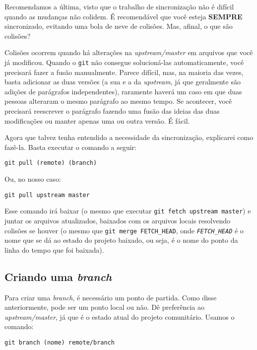 \documentclass[a4paper,oneside,10pt]{memoir}
\begin{document}
Recomendamos a última, visto que o trabalho de sincronização não é difícil
quando as mudanças não colidem. É recomendável que você esteja \textbf{SEMPRE}
sincronizado, evitando uma bola de neve de colisões. Mas, afinal, o que são
colisões?

Colisões ocorrem quando há alterações na \emph{upstream/master} em arquivos que
você já modificou. Quando o \texttt{git} não consegue solucioná-las
automaticamen\-te, você precisará fazer a fusão manualmente. Parece difícil,
mas, na maioria das vezes, basta adicionar as duas versões (a sua e a da
\emph{upstream}, já que geralmente são adições de parágrafos independentes),
raramente haverá um caso em que duas pessoas alteraram o mesmo parágrafo ao
mesmo tempo. Se acontecer, você precisará reescrever o parágrafo fazendo uma
fusão das ideias das duas modificações ou manter apenas uma ou outra versão. É
fácil.

Agora que talvez tenha entendido a necessidade da sincronização, explicarei
como fazê-la. Basta executar o comando a seguir:

\begin{center}
\texttt{git pull (remote) (branch)}
\end{center}

Ou, no nosso caso:

\begin{center}
\texttt{git pull upstream master}
\end{center}

Esse comando irá baixar (o mesmo que executar \texttt{git fetch upstream
mas\-ter}) e juntar os arquivos atualizados, baixados com os arquivos locais
resolvendo colisões se houver (o mesmo que \texttt{git merge FETCH\_HEAD}, onde
\emph{\texttt{FETCH\_\-HEAD}} é o nome que se dá ao estado do projeto baixado,
ou seja, é o nome do ponto da linha do tempo que foi baixada).

\subsection{Criando uma \emph{branch}}

Para criar uma \emph{branch}, é necessário um ponto de partida. Como disse
anteriormente, pode ser um ponto local ou não. Dê preferência ao
\emph{upstream/master}, já que é o estado atual do projeto comunitário. Usamos
o comando:

\begin{center}
\texttt{git branch (nome) remote/branch}
\end{center}
\end{document}

